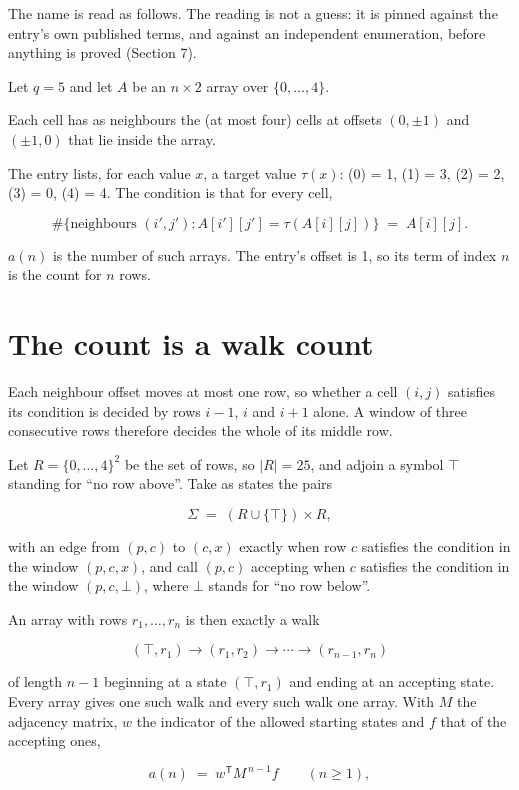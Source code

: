 \documentclass[11pt]{article}
\theoremstyle{definition}
\begin{document}
The name is read as follows. The reading is not a guess: it is pinned against the entry's own published terms, and against an independent enumeration, before anything is proved (Section 7).

Let $q = 5$ and let $A$ be an $n \times 2$ array over $\{0,\dots,4\}$.

Each cell has as neighbours the (at most four) cells at offsets $(0,\pm1)$ and $(\pm1,0)$ that lie inside the array.

The entry lists, for each value $x$, a target value $\tau(x)$: \tau(0) = 1, \tau(1) = 3, \tau(2) = 2, \tau(3) = 0, \tau(4) = 4. The condition is that for every cell,

\[\#\{\text{neighbours } (i',j') : A[i'][j'] = \tau(A[i][j])\} \;=\; A[i][j].\]

$a(n)$ is the number of such arrays. The entry's offset is 1, so its term of index $n$ is the count for $n$ rows.

\section{The count is a walk count}

Each neighbour offset moves at most one row, so whether a cell $(i,j)$ satisfies its condition is decided by rows $i-1$, $i$ and $i+1$ alone. A window of three consecutive rows therefore decides the whole of its middle row.

Let $R = \{0,\dots,4\}^{2}$ be the set of rows, so $|R| = 25$, and adjoin a symbol $\top$ standing for ``no row above''. Take as states the pairs

\[\Sigma \;=\; (R \cup \{\top\}) \times R,\]

with an edge from $(p,c)$ to $(c,x)$ exactly when row $c$ satisfies the condition in the window $(p,c,x)$, and call $(p,c)$ accepting when $c$ satisfies the condition in the window $(p,c,\bot)$, where $\bot$ stands for ``no row below''.

An array with rows $r_1,\dots,r_n$ is then exactly a walk

\[(\top,r_1) \to (r_1,r_2) \to \cdots \to (r_{n-1},r_n)\]

of length $n-1$ beginning at a state $(\top,r_1)$ and ending at an accepting state. Every array gives one such walk and every such walk one array. With $M$ the adjacency matrix, $w$ the indicator of the allowed starting states and $f$ that of the accepting ones,

\[a(n) \;=\; w^{\mathsf T} M^{\,n-1} f \qquad (n \ge 1),\]
\end{document}
